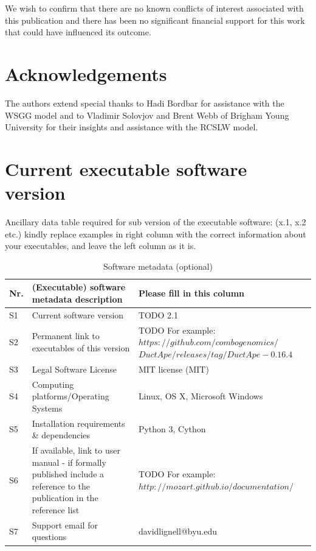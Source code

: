 \documentclass[preprint,12pt, a4paper]{elsarticle}
\begin{document}
We wish to confirm that there are no known conflicts of interest associated with this publication and there has been no significant financial support for this work that could have influenced its outcome.


\section*{Acknowledgements}
\label{}

The authors extend special thanks to Hadi Bordbar for assistance with the WSGG model and to Vladimir Solovjov and Brent Webb of Brigham Young University for their insights and assistance with the RCSLW model. 





 
 

\section*{Current executable software version}
\label{}

Ancillary data table required for sub version of the executable software: (x.1, x.2 etc.) kindly replace examples in right column with the correct information about your executables, and leave the left column as it is.

\begin{table}[!h]
\begin{tabular}{|l|p{6.5cm}|p{6.5cm}|}
\hline
\textbf{Nr.} & \textbf{(Executable) software metadata description} & \textbf{Please fill in this column} \\
\hline
S1 & Current software version & TODO 2.1 \\
\hline
S2 & Permanent link to executables of this version  & TODO For example: $https://github.com/combogenomics/$ $DuctApe/releases/tag/DuctApe-0.16.4$ \\
\hline
S3 & Legal Software License & MIT license (MIT) \\
\hline
S4 & Computing platforms/Operating Systems & Linux, OS X, Microsoft Windows\\
\hline
S5 & Installation requirements \& dependencies & Python 3, Cython \\
\hline
S6 & If available, link to user manual - if formally published include a reference to the publication in the reference
    list & TODO For example: $http://mozart.github.io/documentation/$ \\
\hline
S7 & Support email for questions & davidlignell@byu.edu \\
\hline
\end{tabular}
\caption{Software metadata (optional)}
\label{} 
\end{table}
\end{document}
